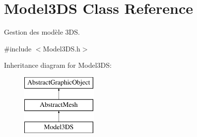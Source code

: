 \hypertarget{classModel3DS}{\section{Model3\-D\-S Class Reference}
\label{classModel3DS}
}


Gestion des modèle 3\-D\-S.  




{\ttfamily \#include $<$Model3\-D\-S.\-h$>$}

Inheritance diagram for Model3\-D\-S\-:\begin{figure}[H]
\begin{center}
\leavevmode
\includegraphics[height=3.000000cm]{classModel3DS}
\end{center}
\end{figure}
